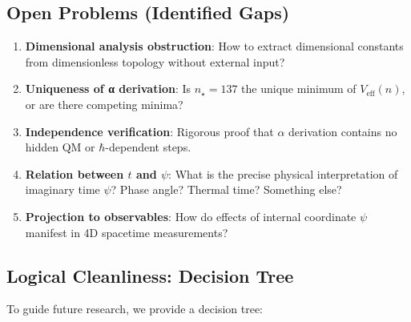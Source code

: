 \documentclass[12pt]{article}
\begin{document}
\subsection{Open Problems (Identified Gaps)}

\begin{enumerate}
\item \textbf{Dimensional analysis obstruction}: How to extract dimensional constants from dimensionless topology without external input?

\item \textbf{Uniqueness of α derivation}: Is $n_\star = 137$ the unique minimum of $V_{\text{eff}}(n)$, or are there competing minima?

\item \textbf{Independence verification}: Rigorous proof that $\alpha$ derivation contains no hidden QM or $\hbar$-dependent steps.

\item \textbf{Relation between $t$ and $\psi$}: What is the precise physical interpretation of imaginary time $\psi$? Phase angle? Thermal time? Something else?

\item \textbf{Projection to observables}: How do effects of internal coordinate $\psi$ manifest in 4D spacetime measurements?
\end{enumerate}

\subsection{Logical Cleanliness: Decision Tree}

To guide future research, we provide a decision tree:
\end{document}
